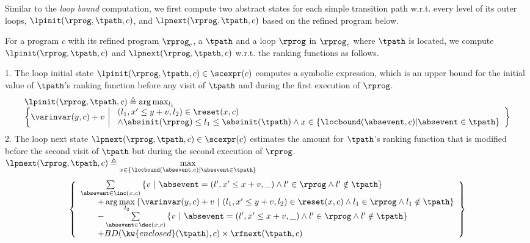 Similar to the \emph{loop bound} computation,
we first compute two abstract states for each simple transition path w.r.t. every level of its outer loops,
$\lpinit(\rprog, \tpath, c)$, and $\lpnext(\rprog, \tpath, c)$ based on the refined program below.
\begin{defn}
\label{def:alg-loopabsstate}
For a program $c$ with its refined program $\rprog_c$, a $\tpath$ and a loop $\rprog$ in $\rprog_c$ where $\tpath$ is located, we compute 
$\lpinit(\rprog, \tpath, c)$ and $\lpnext(\rprog, \tpath, c)$
w.r.t. the ranking functions as follows.
 
1. The loop initial state 
$\lpinit(\rprog, \tpath, c) \in \scexpr(c)$ computes a symbolic expression, which is an upper bound for the initial value of $\tpath$'s ranking function before
any visit of $\tpath$ and during the first execution of $\rprog$.
\[
 \begin{array}{l}
 \lpinit(\rprog, \tpath, c) \triangleq 
 \arg\max_{l_1}
 \\
 \left\{
 \varinvar(y, c) + v ~\middle\vert~ 
 \begin{array}{l} 
 (l_1, x' \leq y + v, l_2) \in \reset(x, c) 
 \\
 \land \absinit(\rprog) \leq l_1 \leq \absinit(\tpath)
 \land
 x \in \left\{ \locbound(\absevent, c) | \absevent \in \tpath \right\}
 \end{array}
 \right\}
 \end{array}
 \]
2.
The loop next state 
$\lpnext(\rprog, \tpath, c) \in \scexpr(c)$ 
estimates the amount for $\tpath$'s ranking function
that is modified before
the second visit of $\tpath$ but during the second execution of $\rprog$.
$ 
\lpnext(\rprog, \tpath, c) \triangleq 
\max\limits_{x \in \left\{ \locbound(\absevent, c) | \absevent \in \tpath \right\}}
$
%
{\small
\[
 \begin{array}{l}
 \left\{
 \begin{array}{l}
 \sum\limits_{\absevent \in \inc(x, c) }
 \left\{ 
 v ~\middle\vert~ \absevent = (l', x' \leq x + v, \_) \land l' \in \rprog 
 \land l' \notin \tpath \right\}
 \\ \qquad 
 + \arg\max\limits_{l_2 }
 \left\{ \varinvar(y, c) + v ~\middle\vert~ 
 (l_1, x' \leq y + v, l_2) \in \reset(x, c) \land l_1 \in \rprog \land l_1 \notin \tpath\right\}
 \\ \qquad 
 - \sum\limits_{ \absevent \in \dec(x, c) }\left\{ 
 v 
 ~\middle\vert~ \absevent = (l', x' \leq x + v, \_) \land l' \in \rprog \land l' \notin \tpath \right\}
 \\ \qquad 
 + BD(\kw{enclosed}(\tpath), c) \times \rfnext(\tpath, c)
 \end{array}
 \right\}
 \end{array}
 \]
 }
\end{defn}
